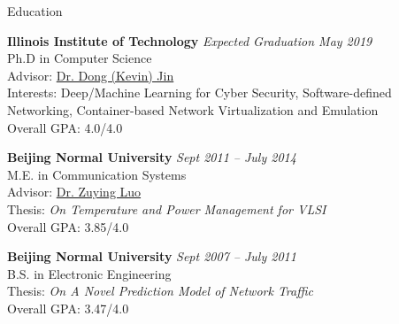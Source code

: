 \documentclass{resume} %
\begin{document}
\lastupdated


\begin{rSection}{Education}

{\bf Illinois Institute of Technology} \hfill {\em Expected Graduation May 2019} \\ 
Ph.D in Computer Science \\
Advisor: \href{http://cs.iit.edu/~djin/index.html}{Dr. Dong (Kevin) Jin} \\
Interests: Deep/Machine Learning for Cyber Security, Software-defined Networking, Container-based Network Virtualization and Emulation \\
Overall GPA: 4.0/4.0

{\bf Beijing Normal University} \hfill{\em Sept 2011 -- July 2014} \\
M.E. in Communication Systems\\
Advisor: \href{http://cist.bnu.edu.cn/xygk/szdw/zgj/552.html}{Dr. Zuying Luo} \\
Thesis: \emph{On Temperature and Power Management for VLSI} \\
Overall GPA: 3.85/4.0

{\bf Beijing Normal University} \hfill{\em Sept 2007 -- July 2011} \\
B.S. in Electronic Engineering\\
Thesis: \emph{On A Novel Prediction Model of Network Traffic} \\
Overall GPA: 3.47/4.0

\end{rSection}

\end{document}
